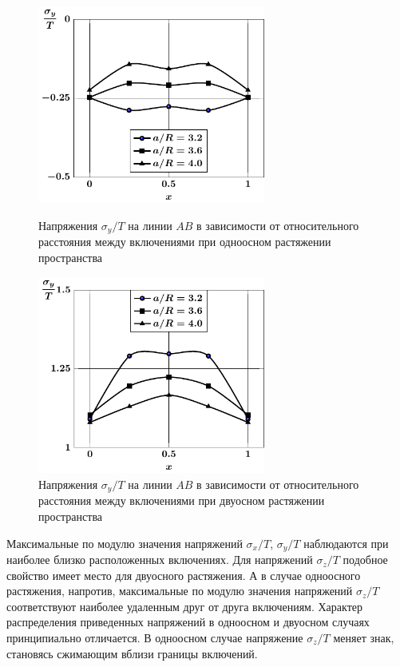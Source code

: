 \begin{figure}[h!]
\centering\footnotesize
\parbox[b]{7.5cm}{\centering\includegraphics[width=7.5cm]{inc5-a-d95-g25-t1-ab-sig_y.pdf}
\caption{Напряжения $\sigma_y/T$ на линии  $AB$ в зависимости от относительного расстояния между включениями при одноосном растяжении пространства
\label{f:8:56}}}\hfil\hfil
\parbox[b]{7.5cm}{\centering\includegraphics[width=7.5cm]{inc5-a-d95-g25-t2-ab-sig_y.pdf}
\caption{Напряжения $\sigma_y/T$ на линии  $AB$ в зависимости от относительного расстояния между включениями при двуосном растяжении пространства
\label{f:8:57}}}
\end{figure}

Максимальные по модулю значения напряжений $\sigma_x/T$, $\sigma_y/T$ наблюдаются при наиболее близко расположенных включениях. Для напряжений $\sigma_z/T$ подобное свойство имеет место для двуосного растяжения. А в случае одноосного растяжения, напротив, максимальные по модулю значения напряжений $\sigma_z/T$ соответствуют наиболее удаленным друг от друга включениям. Характер распределения приведенных напряжений в одноосном и двуосном случаях принципиально отличается. В одноосном случае напряжение $\sigma_z/T$ меняет знак, становясь сжимающим вблизи границы включений.

